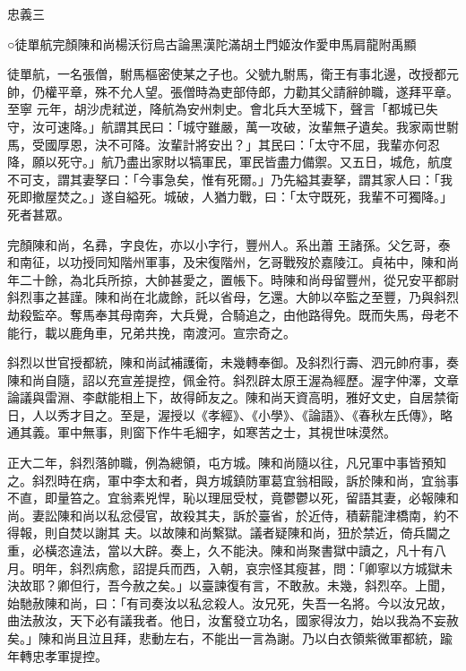 
\begin{pinyinscope}

 忠義三



 ○徒單航完顏陳和尚楊沃衍烏古論黑漢陀滿胡土門姬汝作愛申馬肩龍附禹顯



 徒單航，一名張僧，駙馬樞密使某之子也。父號九駙馬，衛王有事北邊，改授都元帥，仍權平章，殊不允人望。張僧時為吏部侍郎，力勸其父請辭帥職，遂拜平章。至寧
 元年，胡沙虎弒逆，降航為安州刺史。會北兵大至城下，聲言「都城已失守，汝可速降。」航謂其民曰：「城守雖嚴，萬一攻破，汝輩無孑遺矣。我家兩世駙馬，受國厚恩，決不可降。汝輩計將安出？」其民曰：「太守不屈，我輩亦何忍降，願以死守。」航乃盡出家財以犒軍民，軍民皆盡力備禦。又五日，城危，航度不可支，謂其妻孥曰：「今事急矣，惟有死爾。」乃先縊其妻拏，謂其家人曰：「我死即撤屋焚之。」遂自縊死。城破，人猶力戰，曰：「太守既死，我輩不可獨降。」死者甚眾。



 完顏陳和尚，名彞，字良佐，亦以小字行，豐州人。系出蕭
 王諸孫。父乞哥，泰和南征，以功授同知階州軍事，及宋復階州，乞哥戰歿於嘉陵江。貞祐中，陳和尚年二十餘，為北兵所掠，大帥甚愛之，置帳下。時陳和尚母留豐州，從兄安平都尉斜烈事之甚謹。陳和尚在北歲餘，託以省母，乞還。大帥以卒監之至豐，乃與斜烈劫殺監卒。奪馬奉其母南奔，大兵覺，合騎追之，由他路得免。既而失馬，母老不能行，載以鹿角車，兄弟共挽，南渡河。宣宗奇之。



 斜烈以世官授都統，陳和尚試補護衛，未幾轉奉御。及斜烈行壽、泗元帥府事，奏陳和尚自隨，詔以充宣差提控，佩金符。斜烈辟太原王渥為經歷。渥字仲澤，文章
 論議與雷淵、李獻能相上下，故得師友之。陳和尚天資高明，雅好文史，自居禁衛日，人以秀才目之。至是，渥授以《孝經》、《小學》、《論語》、《春秋左氏傳》，略通其義。軍中無事，則窗下作牛毛細字，如寒苦之士，其視世味漠然。



 正大二年，斜烈落帥職，例為總領，屯方城。陳和尚隨以往，凡兄軍中事皆預知之。斜烈時在病，軍中李太和者，與方城鎮防軍葛宜翁相毆，訴於陳和尚，宜翁事不直，即量笞之。宜翁素兇悍，恥以理屈受杖，竟鬱鬱以死，留語其妻，必報陳和尚。妻訟陳和尚以私忿侵官，故殺其夫，訴於臺省，於近侍，積薪龍津橋南，約不得報，則自焚以謝其
 夫。以故陳和尚繫獄。議者疑陳和尚，狃於禁近，倚兵閫之重，必橫恣違法，當以大辟。奏上，久不能決。陳和尚聚書獄中讀之，凡十有八月。明年，斜烈病愈，詔提兵而西，入朝，哀宗怪其瘦甚，問：「卿寧以方城獄未決故耶？卿但行，吾今赦之矣。」以臺諫復有言，不敢赦。未幾，斜烈卒。上聞，始馳赦陳和尚，曰：「有司奏汝以私忿殺人。汝兄死，失吾一名將。今以汝兄故，曲法赦汝，天下必有議我者。他日，汝奮發立功名，國家得汝力，始以我為不妄赦矣。」陳和尚且泣且拜，悲動左右，不能出一言為謝。乃以白衣領紫微軍都統，踰年轉忠孝軍提控。




\end{pinyinscope}
